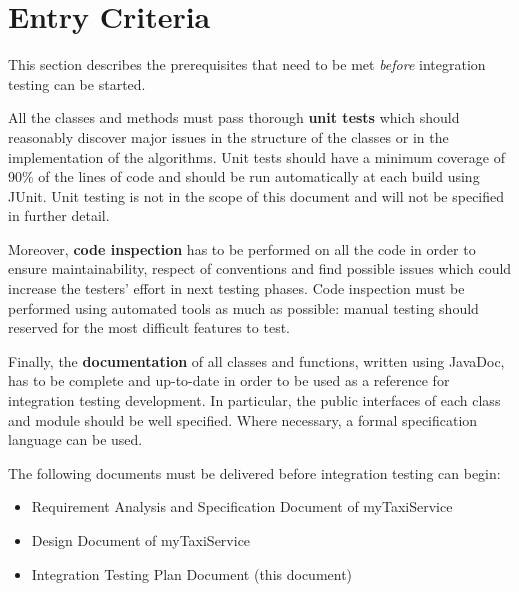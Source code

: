 \section{Entry Criteria}
\label{sec:entry-criteria}

This section describes the prerequisites that need to be met \emph{before} integration testing can be started.

All the classes and methods must pass thorough \textbf{unit tests} which should reasonably discover major issues in the structure of the classes or in the implementation of the algorithms. Unit tests should have a minimum coverage of 90\% of the lines of code and should be run automatically at each build using JUnit. Unit testing is not in the scope of this document and will not be specified in further detail.

Moreover, \textbf{code inspection} has to be performed on all the code in order to ensure maintainability, respect of conventions and find possible issues which could increase the testers' effort in next testing phases. Code inspection must be performed using automated tools as much as possible: manual testing should reserved for the most difficult features to test.

Finally, the \textbf{documentation} of all classes and functions, written using JavaDoc, has to be complete and up-to-date in order to be used as a reference for integration testing development. In particular, the public interfaces of each class and module should be well specified. Where necessary, a formal specification language can be used.

The following documents must be delivered before integration testing can begin:
\begin{itemize}
    \item Requirement Analysis and Specification Document of myTaxiService
    \item Design Document of myTaxiService
    \item Integration Testing Plan Document (this document)
\end{itemize}
